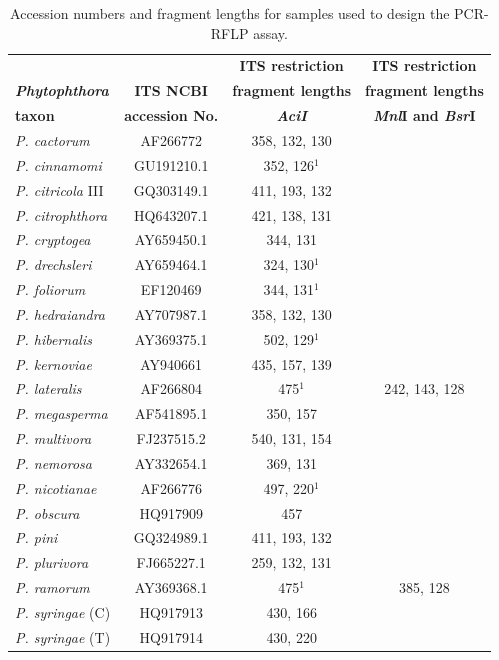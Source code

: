 \documentclass[12pt]{article}
\begin{document}
\begin{table}[!ht]
\caption{Accession numbers and fragment lengths for samples used to design the PCR-RFLP assay.}
\begin{tabular}{lccc}
\hline
				&				&	\textbf{ITS restriction}		&	\textbf{ITS restriction} \\
\emph{\textbf{Phytophthora}}	&	\textbf{ITS NCBI}	&	\textbf{fragment lengths}		&	\textbf{fragment lengths } \\
\textbf{taxon}			&	\textbf{accession No.}	&	\emph{\textbf{AciI}}			&	\textbf{\emph{Mnl}I and \emph{Bsr}I} \\
\hline
\emph{P. cactorum}		&	AF266772	&	358, 132, 130	& \\
\emph{P. cinnamomi}	&	GU191210.1	&	352, 126$^{1}$	& \\
\emph{P. citricola} III	&	GQ303149.1	&	411, 193, 132	& \\
\emph{P. citrophthora}	&	HQ643207.1	&	421, 138, 131	& \\
\emph{P. cryptogea}	&	AY659450.1	&	344, 131		& \\
\emph{P. drechsleri}	&	AY659464.1	&	324, 130$^{1}$	& \\
\emph{P. foliorum}		&	EF120469	&	344, 131$^{1}$	& \\
\emph{P. hedraiandra}	&	AY707987.1	&	358, 132, 130	& \\
\emph{P. hibernalis}	&	AY369375.1	&	502, 129$^{1}$		& \\
\emph{P. kernoviae}	&	AY940661	&	435, 157, 139	& \\
\emph{P. lateralis}	&	AF266804	&	475$^{1}$		&	242, 143, 128	\\
\emph{P. megasperma}	&	AF541895.1	&	350, 157		& \\
\emph{P. multivora}	&	FJ237515.2	&	540, 131, 154	& \\
\emph{P. nemorosa}		&	AY332654.1	&	369, 131		& \\
\emph{P. nicotianae}	&	AF266776	&	497, 220$^{1}$	& \\
\emph{P. obscura}		&	HQ917909	&	457		& \\
\emph{P. pini}		&	GQ324989.1	&	411, 193, 132	& \\
\emph{P. plurivora}	&	FJ665227.1	&	259, 132, 131	& \\
\emph{P. ramorum}		&	AY369368.1	&	475$^{1}$		&	385, 128	\\
\emph{P. syringae} (C)	&	HQ917913	&	430, 166		& \\
\emph{P. syringae} (T)	&	HQ917914	&	430, 220		& \\

\end{tabular}
\end{table}
\end{document}
